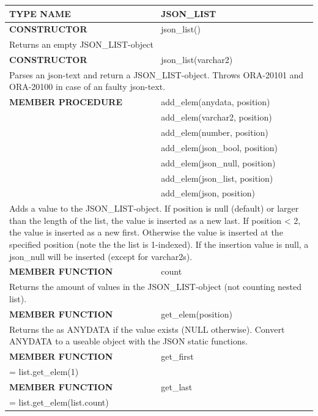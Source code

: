 \documentclass[11pt,twocolumn, a4paper]{article}
\begin{document}
\begin{longtable}{| l | l |}

\hline
  \rowcolor{gray}\color{white}
  \textbf{TYPE NAME} & \color{white}\textbf{JSON\_LIST} \\
\hline

\hline
  \textbf{CONSTRUCTOR} & json\_list()\\
\hline
  \multicolumn{2}{|p{15cm}|}{Returns an empty JSON\_LIST-object} \\
\hline

\hline
  \textbf{CONSTRUCTOR} & json\_list(varchar2)\\
\hline
  \multicolumn{2}{|p{15cm}|}{Parses an json-text and return a JSON\_LIST-object. 
Throws ORA-20101 and ORA-20100 in case of an faulty json-text.} \\
\hline

\hline
  \textbf{MEMBER PROCEDURE} & add\_elem(anydata, position)\\
& add\_elem(varchar2, position)\\
& add\_elem(number, position)\\
& add\_elem(json\_bool, position)\\
& add\_elem(json\_null, position)\\
& add\_elem(json\_list, position)\\
& add\_elem(json, position)\\
\hline
  \multicolumn{2}{|p{15cm}|}{Adds a value to the JSON\_LIST-object. If position is null (default) or larger than the length of the list, the value is inserted as a new last. If position < 2, the value is inserted as a new first. Otherwise the value is inserted at the specified position (note the the list is 1-indexed). If the insertion value is null, a json\_null will be inserted (except for varchar2s).} \\
\hline

\hline
  \textbf{MEMBER FUNCTION} & count\\
\hline
  \multicolumn{2}{|p{15cm}|}{Returns the amount of values in the JSON\_LIST-object (not counting nested list).} \\
\hline

\hline
  \textbf{MEMBER FUNCTION} & get\_elem(position)\\
\hline
  \multicolumn{2}{|p{15cm}|}{Returns the as ANYDATA if the value exists (NULL otherwise). Convert ANYDATA to a useable object with the JSON static functions.} \\
\hline

\hline
  \textbf{MEMBER FUNCTION} & get\_first\\
\hline
  \multicolumn{2}{|p{15cm}|}{ = list.get\_elem(1)} \\
\hline
\hline
  \textbf{MEMBER FUNCTION} & get\_last\\
\hline
  \multicolumn{2}{|p{15cm}|}{ = list.get\_elem(list.count)} \\
\hline


\end{longtable}
\end{document}

